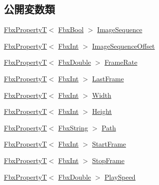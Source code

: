 \subsection*{公開変数類}
\begin{DoxyCompactItemize}
\item 
\hyperlink{class_fbx_property_t}{Fbx\+PropertyT}$<$ \hyperlink{fbxtypes_8h_a92e0562b2fe33e76a242f498b362262e}{Fbx\+Bool} $>$ \hyperlink{class_fbx_video_a8d98e668bd42f8ed67e8bc28488d0abb}{Image\+Sequence}
\item 
\hyperlink{class_fbx_property_t}{Fbx\+PropertyT}$<$ \hyperlink{fbxtypes_8h_a088fa96de3b0b3ea69f0f6afef525dfb}{Fbx\+Int} $>$ \hyperlink{class_fbx_video_acc7a05788def81e3b7b1cb3d003021fb}{Image\+Sequence\+Offset}
\item 
\hyperlink{class_fbx_property_t}{Fbx\+PropertyT}$<$ \hyperlink{fbxtypes_8h_a171e72a1c46fc15c1a6c9c31948c1c5b}{Fbx\+Double} $>$ \hyperlink{class_fbx_video_ac97913b5255c4f67ec2d401d8ff2b619}{Frame\+Rate}
\item 
\hyperlink{class_fbx_property_t}{Fbx\+PropertyT}$<$ \hyperlink{fbxtypes_8h_a088fa96de3b0b3ea69f0f6afef525dfb}{Fbx\+Int} $>$ \hyperlink{class_fbx_video_a30d7edd0fc1e23268702f5811327e526}{Last\+Frame}
\item 
\hyperlink{class_fbx_property_t}{Fbx\+PropertyT}$<$ \hyperlink{fbxtypes_8h_a088fa96de3b0b3ea69f0f6afef525dfb}{Fbx\+Int} $>$ \hyperlink{class_fbx_video_a9f1d9f9874ac3a9274a754cfb311fc30}{Width}
\item 
\hyperlink{class_fbx_property_t}{Fbx\+PropertyT}$<$ \hyperlink{fbxtypes_8h_a088fa96de3b0b3ea69f0f6afef525dfb}{Fbx\+Int} $>$ \hyperlink{class_fbx_video_a9e77b423cac730992fe57429c302593c}{Height}
\item 
\hyperlink{class_fbx_property_t}{Fbx\+PropertyT}$<$ \hyperlink{class_fbx_string}{Fbx\+String} $>$ \hyperlink{class_fbx_video_a3741896f51e9702d4c8b9d0e7065264c}{Path}
\item 
\hyperlink{class_fbx_property_t}{Fbx\+PropertyT}$<$ \hyperlink{fbxtypes_8h_a088fa96de3b0b3ea69f0f6afef525dfb}{Fbx\+Int} $>$ \hyperlink{class_fbx_video_a61a7c941bfe1022b4cc0a8ba14b932f1}{Start\+Frame}
\item 
\hyperlink{class_fbx_property_t}{Fbx\+PropertyT}$<$ \hyperlink{fbxtypes_8h_a088fa96de3b0b3ea69f0f6afef525dfb}{Fbx\+Int} $>$ \hyperlink{class_fbx_video_aab5d673b818ce8a797ac47851a34e996}{Stop\+Frame}
\item 
\hyperlink{class_fbx_property_t}{Fbx\+PropertyT}$<$ \hyperlink{fbxtypes_8h_a171e72a1c46fc15c1a6c9c31948c1c5b}{Fbx\+Double} $>$ \hyperlink{class_fbx_video_a43c6cf4ab4d46dd1a962258f5e4c42f2}{Play\+Speed}

\end{DoxyCompactItemize}
